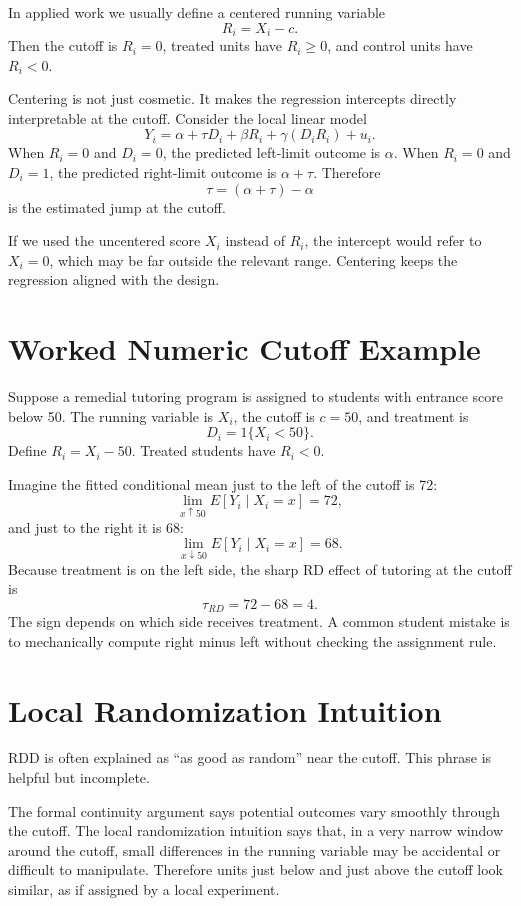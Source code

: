 In applied work we usually define a centered running variable
\[
    R_i = X_i - c.
\]
Then the cutoff is $R_i=0$, treated units have $R_i \geq 0$, and control units have $R_i<0$.

Centering is not just cosmetic. It makes the regression intercepts directly interpretable at the cutoff. Consider the local linear model
\[
    Y_i = \alpha + \tau D_i + \beta R_i + \gamma(D_iR_i) + u_i.
\]
When $R_i=0$ and $D_i=0$, the predicted left-limit outcome is $\alpha$. When $R_i=0$ and $D_i=1$, the predicted right-limit outcome is $\alpha+\tau$. Therefore
\[
    \tau = (\alpha+\tau)-\alpha
\]
is the estimated jump at the cutoff.

If we used the uncentered score $X_i$ instead of $R_i$, the intercept would refer to $X_i=0$, which may be far outside the relevant range. Centering keeps the regression aligned with the design.

\section{Worked Numeric Cutoff Example}

Suppose a remedial tutoring program is assigned to students with entrance score below 50. The running variable is $X_i$, the cutoff is $c=50$, and treatment is
\[
    D_i = 1\{X_i < 50\}.
\]
Define $R_i=X_i-50$. Treated students have $R_i<0$.

Imagine the fitted conditional mean just to the left of the cutoff is 72:
\[
    \lim_{x \uparrow 50} E[Y_i\mid X_i=x] = 72,
\]
and just to the right it is 68:
\[
    \lim_{x \downarrow 50} E[Y_i\mid X_i=x] = 68.
\]
Because treatment is on the left side, the sharp RD effect of tutoring at the cutoff is
\[
    \tau_{RD} = 72-68 = 4.
\]
The sign depends on which side receives treatment. A common student mistake is to mechanically compute right minus left without checking the assignment rule.

\section{Local Randomization Intuition}

RDD is often explained as ``as good as random'' near the cutoff. This phrase is helpful but incomplete.

The formal continuity argument says potential outcomes vary smoothly through the cutoff. The local randomization intuition says that, in a very narrow window around the cutoff, small differences in the running variable may be accidental or difficult to manipulate. Therefore units just below and just above the cutoff look similar, as if assigned by a local experiment.


